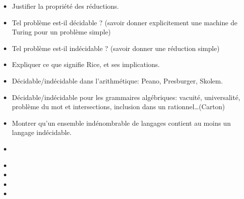 \documentclass{agregfiche}
\begin{document}
\secquestionsclassiques
\begin{itemize}
\item Justifier la propriété des réductions.
\item Tel problème est-il décidable ? (savoir donner explicitement une machine de Turing pour un problème simple)
\item Tel problème est-il indécidable ? (savoir donner une réduction simple)
\item Expliquer ce que signifie Rice, et ses implications.
\item Décidable/indécidable dans l'arithmétique: Peano, Presburger, Skolem.
\item Décidable/indécidable pour les grammaires algébriques: vacuité, universalité, problème du mot et intersections, inclusion dans un rationnel\dots (Carton)
\item Montrer qu'un ensemble indénombrable de langages contient au moins un langage indécidable.
\end{itemize}

\secreferences
\begin{itemize}
\item 
\end{itemize}

\secdev
\begin{itemize}
\item 
\item 
\item 
\item 

\end{itemize}
\end{document}
